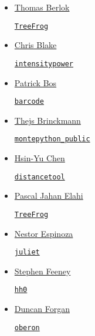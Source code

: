 \documentclass[11pt,a4paper]{article}
\begin{document}
\begin{itemize}
\item \href{https://github.com/tberlok}{Thomas Berlok} 
  \begin{itemize}
   \href{https://github.com/pelahi/TreeFrog}{\tt TreeFrog}
  \end{itemize}

\item \href{https://github.com/cblakeastro}{Chris Blake}
  \begin{itemize}
    \href{https://github.com/cblakeastro/intensitypower}{{\tt intensitypower}}
  \end{itemize}

\item \href{https://github.com/egpbos}{Patrick Bos}
  \begin{itemize}
    \href{https://github.com/egpbos/barcode}{{\tt barcode}}
  \end{itemize}

\item \href{https://github.com/brinckmann}{Thejs Brinckmann}
  \begin{itemize}
    \href{https://github.com/brinckmann/montepython\_public}{{\tt montepython\_public}}
  \end{itemize}
  
\item \href{https://github.com/hsinyuc}{Hsin-Yu Chen} 
  \begin{itemize}
    \href{https://github.com/hsinyuc/distancetool}{\tt distancetool}
  \end{itemize}

\item \href{https://github.com/pelahi}{Pascal Jahan Elahi} 
  \begin{itemize}
   \href{https://github.com/pelahi/TreeFrog}{\tt TreeFrog}
  \end{itemize}

\item \href{https://github.com/nespinoza}{Nestor Espinoza}
  \begin{itemize}
    \href{https://github.com/nespinoza/juliet}{\tt juliet}
  \end{itemize}

\item \href{https://github.com/sfeeney}{Stephen Feeney}
  \begin{itemize}
    \href{https://github.com/sfeeney/hh0}{{\tt hh0}}
  \end{itemize}

\item \href{https://github.com/dh4gan/}{Duncan Forgan}
  \begin{itemize}
    \href{https://github.com/dh4gan/oberon}{\tt oberon}
  \end{itemize}


\end{itemize}
\end{document}
